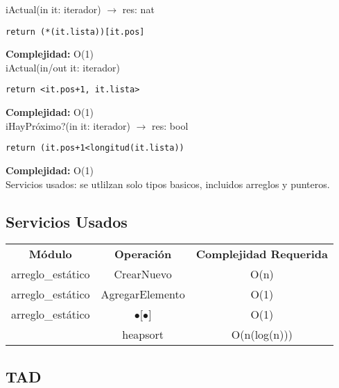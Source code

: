 iActual(in it: iterador) $\rightarrow$ res: nat
\begin{lstlisting}[mathescape]
 return (*(it.lista))[it.pos]
\end{lstlisting}
\textbf{Complejidad:} O(1)\\

iActual(in/out it: iterador)
\begin{lstlisting}[mathescape]
 return <it.pos+1, it.lista>
\end{lstlisting}
\textbf{Complejidad:} O(1)\\

iHayPr\'oximo?(in it: iterador) $\rightarrow$ res: bool
\begin{lstlisting}[mathescape]
 return (it.pos+1<longitud(it.lista))
\end{lstlisting}
\textbf{Complejidad:} O(1)\\

Servicios usados: se utlilzan solo tipos basicos, incluidos arreglos y punteros.

\subsection{Servicios Usados}
\begin{center}
\begin{tabular*}{2.75\textwidth}{c |c | c }
\textbf{M\'odulo} & \textbf{Operaci\'on} & \textbf{Complejidad Requerida}\\
arreglo\_est\'atico & CrearNuevo & O(n)\\
arreglo\_est\'atico & AgregarElemento & O(1)\\
arreglo\_est\'atico & $\bullet$[$\bullet$] & O(1)\\
& heapsort & O(n(log(n)))\\
\end{tabular*}
\end{center}


\subsection {TAD }

